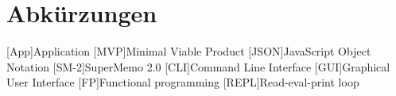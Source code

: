 \chapter{Abkürzungen}\label{a:Abkuerzungen}

\begin{acronym}
    [App]{Application}
    [MVP]{Minimal Viable Product}
    [JSON]{JavaScript Object Notation}
    [SM-2]{SuperMemo 2.0}
    [CLI]{Command Line Interface}
    [GUI]{Graphical User Interface}
    [FP]{Functional programming}
    [REPL]{Read-eval-print loop}

\end{acronym}